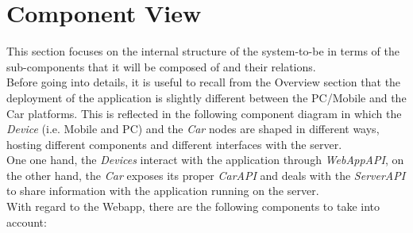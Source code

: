 \documentclass[11pt,a4paper]{report}
\begin{document}
\section{Component View}
This section focuses on the internal structure of the system-to-be in terms of the sub-components that it will be composed of and their relations.\\Before going into details, it is useful to recall from the Overview section that the deployment of the application is slightly different between the PC/Mobile and the Car platforms. This is reflected in the following component diagram in which the \textit{Device} (i.e. Mobile and PC) and the \textit{Car} nodes are shaped in different ways, hosting different components and different interfaces with the server.\\One one hand, the \textit{Devices} interact with the application through \textit{WebAppAPI}, on the other hand, the \textit{Car} exposes its proper \textit{CarAPI} and deals with the \textit{ServerAPI} to share information with the application running on the server.\\With regard to the Webapp, there are the following components to take into account:
\end{document}
